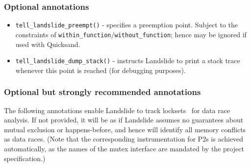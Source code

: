 \subsubsection{Optional annotations}

\begin{itemize}
	\item {\tt tell\_landslide\_preempt()} - specifies a preemption point.
		Subject to the constraints of {\tt within\_function}/{\tt without\_function};
		hence may be ignored if used with Quicksand.
	\item {\tt tell\_landslide\_dump\_stack()} - instructs Landslide to print a stack trace whenever this point is reached (for debugging purposes).
\end{itemize}

\subsubsection{Optional but strongly recommended annotations}

The following annotations enable Landslide to track locksets~\cite{eraser} for data race analysis.
If not provided, it will be as if Landslide assumes no guarantees about mutual exclusion or happens-before,
and hence will identify all memory conflicts as data races.
(Note that the corresponding instrumentation for P2s is achieved automatically,
as the names of the mutex interface are mandated by the project specification.)

